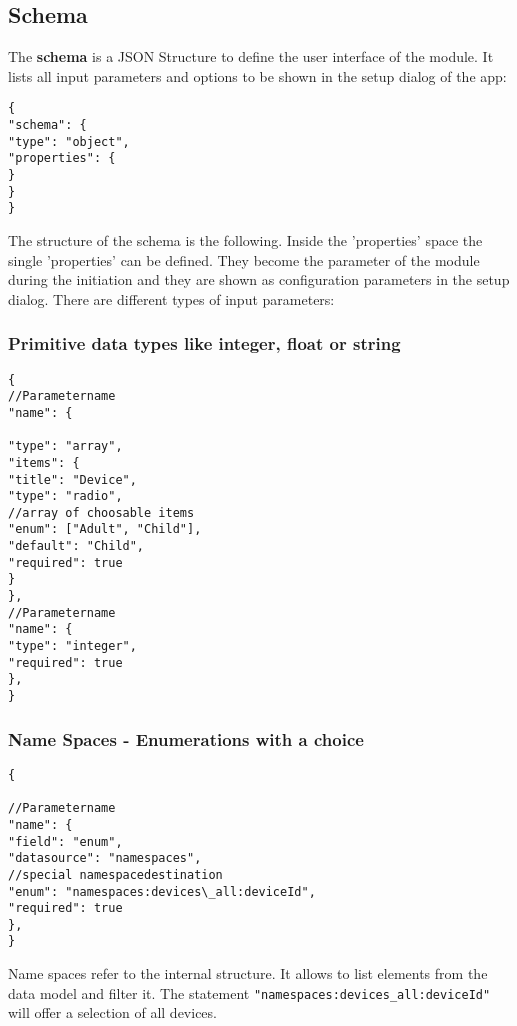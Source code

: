 \subsection{Schema}

The \textbf{schema} is a JSON Structure to define the user interface of the module.
It lists all input parameters and  options to be shown in the setup dialog of the app:

\begin{lstlisting}[caption=Schema Structure]
{
"schema": {
"type": "object",
"properties": {
}
}
}
\end{lstlisting}


The structure of the schema is the following. Inside the 'properties' space the single 'properties' 
can be defined. They become the parameter of the module during the initiation and they 
are shown as configuration parameters in the setup dialog. There are different
types of input parameters:


\subsubsection{Primitive data types like integer, float or string}

\begin{lstlisting}[caption=Schema Structure Simple Type]
{
//Parametername
"name": {

"type": "array",
"items": {
"title": "Device",
"type": "radio",
//array of choosable items
"enum": ["Adult", "Child"],
"default": "Child",
"required": true
}
},
//Parametername
"name": {
"type": "integer",
"required": true
},
}
\end{lstlisting}

\subsubsection{Name Spaces  - Enumerations with a choice}

\begin{lstlisting}[caption=Schema Structure Enumerations with a choice]
{

//Parametername
"name": {
"field": "enum",
"datasource": "namespaces",
//special namespacedestination
"enum": "namespaces:devices\_all:deviceId",
"required": true
},
}
\end{lstlisting}



Name spaces refer to the internal \zway structure. It allows to list elements from 
the \zway data model and filter it. The statement 
\texttt{"namespaces:devices\_all:deviceId"} will offer a selection of all devices.

